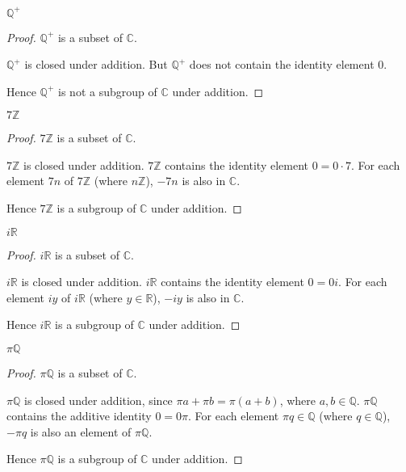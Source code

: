 \newpage
\begin{exercise}
    $\mathbb{Q}^{+}$
\end{exercise}

\begin{proof}
    $\mathbb{Q}^{+}$ is a subset of $\mathbb{C}$.

    $\mathbb{Q}^{+}$ is closed under addition. But $\mathbb{Q}^{+}$ does not contain the identity element $0$.

    Hence $\mathbb{Q}^{+}$ is not a subgroup of $\mathbb{C}$ under addition.
\end{proof}

\newpage
\begin{exercise}
    $7\mathbb{Z}$
\end{exercise}

\begin{proof}
    $7\mathbb{Z}$ is a subset of $\mathbb{C}$.

    $7\mathbb{Z}$ is closed under addition. $7\mathbb{Z}$ contains the identity element $0 = 0\cdot 7$. For each element $7n$ of $7\mathbb{Z}$ (where $n\mathbb{Z}$), $-7n$ is also in $\mathbb{C}$.

    Hence $7\mathbb{Z}$ is a subgroup of $\mathbb{C}$ under addition.
\end{proof}

\newpage
\begin{exercise}
    $i\mathbb{R}$
\end{exercise}

\begin{proof}
    $i\mathbb{R}$ is a subset of $\mathbb{C}$.

    $i\mathbb{R}$ is closed under addition. $i\mathbb{R}$ contains the identity element $0 = 0i$. For each element $iy$ of $i\mathbb{R}$ (where $y\in\mathbb{R}$), $-iy$ is also in $\mathbb{C}$.

    Hence $i\mathbb{R}$ is a subgroup of $\mathbb{C}$ under addition.
\end{proof}

\newpage
\begin{exercise}
    $\pi\mathbb{Q}$
\end{exercise}

\begin{proof}
    $\pi\mathbb{Q}$ is a subset of $\mathbb{C}$.

    $\pi\mathbb{Q}$ is closed under addition, since $\pi a + \pi b = \pi (a + b)$, where $a, b\in\mathbb{Q}$. $\pi\mathbb{Q}$ contains the additive identity $0 = 0\pi$. For each element $\pi q\in\mathbb{Q}$ (where $q\in\mathbb{Q}$), $-\pi q$ is also an element of $\pi\mathbb{Q}$.

    Hence $\pi\mathbb{Q}$ is a subgroup of $\mathbb{C}$ under addition.
\end{proof}

